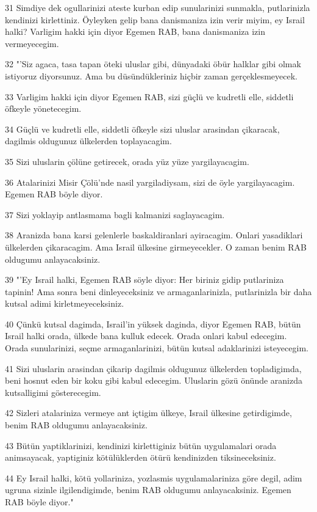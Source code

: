 \par 31 Simdiye dek ogullarinizi ateste kurban edip sunularinizi sunmakla, putlarinizla kendinizi kirlettiniz. Öyleyken gelip bana danismaniza izin verir miyim, ey Israil halki? Varligim hakki için diyor Egemen RAB, bana danismaniza izin vermeyecegim.
\par 32 "'Siz agaca, tasa tapan öteki uluslar gibi, dünyadaki öbür halklar gibi olmak istiyoruz diyorsunuz. Ama bu düsündükleriniz hiçbir zaman gerçeklesmeyecek.
\par 33 Varligim hakki için diyor Egemen RAB, sizi güçlü ve kudretli elle, siddetli öfkeyle yönetecegim.
\par 34 Güçlü ve kudretli elle, siddetli öfkeyle sizi uluslar arasindan çikaracak, dagilmis oldugunuz ülkelerden toplayacagim.
\par 35 Sizi uluslarin çölüne getirecek, orada yüz yüze yargilayacagim.
\par 36 Atalarinizi Misir Çölü'nde nasil yargiladiysam, sizi de öyle yargilayacagim. Egemen RAB böyle diyor.
\par 37 Sizi yoklayip antlasmama bagli kalmanizi saglayacagim.
\par 38 Aranizda bana karsi gelenlerle baskaldiranlari ayiracagim. Onlari yasadiklari ülkelerden çikaracagim. Ama Israil ülkesine girmeyecekler. O zaman benim RAB oldugumu anlayacaksiniz.
\par 39 "'Ey Israil halki, Egemen RAB söyle diyor: Her biriniz gidip putlariniza tapinin! Ama sonra beni dinleyeceksiniz ve armaganlarinizla, putlarinizla bir daha kutsal adimi kirletmeyeceksiniz.
\par 40 Çünkü kutsal dagimda, Israil'in yüksek daginda, diyor Egemen RAB, bütün Israil halki orada, ülkede bana kulluk edecek. Orada onlari kabul edecegim. Orada sunularinizi, seçme armaganlarinizi, bütün kutsal adaklarinizi isteyecegim.
\par 41 Sizi uluslarin arasindan çikarip dagilmis oldugunuz ülkelerden topladigimda, beni hosnut eden bir koku gibi kabul edecegim. Uluslarin gözü önünde aranizda kutsalligimi gösterecegim.
\par 42 Sizleri atalariniza vermeye ant içtigim ülkeye, Israil ülkesine getirdigimde, benim RAB oldugumu anlayacaksiniz.
\par 43 Bütün yaptiklarinizi, kendinizi kirlettiginiz bütün uygulamalari orada animsayacak, yaptiginiz kötülüklerden ötürü kendinizden tiksineceksiniz.
\par 44 Ey Israil halki, kötü yollariniza, yozlasmis uygulamalariniza göre degil, adim ugruna sizinle ilgilendigimde, benim RAB oldugumu anlayacaksiniz. Egemen RAB böyle diyor."
